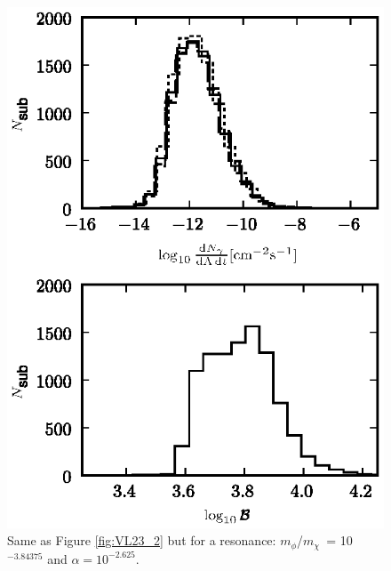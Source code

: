 \documentclass[aps,prd,twocolumn,amsmath,amssymb,floatfix,nofootinbib,10pt]{revtex4}
\newcommand{\mdm}{\ensuremath{m_{\chi}}}
\newcommand{\mv}{\ensuremath{m_{\phi}}}
\begin{document}
\begin{figure}
\centering
\includegraphics{hist_-3.84375_-2.625_10_2.eps}
\caption{Same as Figure \ref{fig:VL23_2} but for a resonance:
\mv/\mdm\ = 10$^{-3.84375}$ and $\alpha = 10^{-2.625}$.}%
\label{fig:VLresonance1}%
\end{figure}
\end{document}
